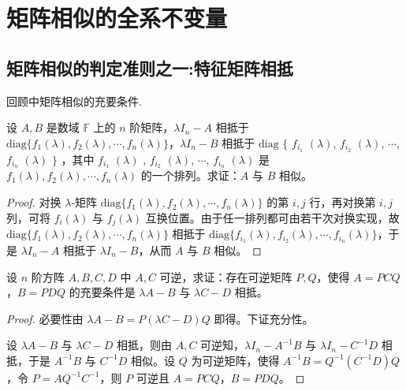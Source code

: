 \documentclass[../../main.tex]{subfiles}%
\begin{document}
\section{矩阵相似的全系不变量}

\subsection{矩阵相似的判定准则之一:特征矩阵相抵}

回顾中矩阵相似的充要条件.

\begin{proposition}\label{proposition:对角元素任意排列仍相似}
设 $A,B$ 是数域 $\mathbb{F}$ 上的 $n$ 阶矩阵，$\lambda I_n - A$ 相抵于 $\mathrm{diag}\{f_1(\lambda), f_2(\lambda), \cdots, f_n(\lambda)\}$，$\lambda I_n - B$ 相抵于 $\mathrm{diag}$ $\{ $ $f_{i_1}$ $(\lambda)$, $f_{i_2}$ $(\lambda)$, $\cdots$, $f_{i_n}$ $(\lambda)$ $\}$ ，其中 $f_{i_1}$ $(\lambda)$ , $f_{i_2}$ $(\lambda)$, $\cdots$, $f_{i_n}$ $(\lambda)$ 是 $f_1(\lambda), f_2(\lambda), \cdots, f_n(\lambda)$ 的一个排列。求证：$A$ 与 $B$ 相似。
\end{proposition}
\begin{proof}

对换 $\lambda$-矩阵 $\mathrm{diag}\{f_1(\lambda), f_2(\lambda), \cdots, f_n(\lambda)\}$ 的第 $i,j$ 行，再对换第 $i,j$ 列，可将 $f_i(\lambda)$ 与 $f_j(\lambda)$ 互换位置。由于任一排列都可由若干次对换实现，故 $\mathrm{diag}\{f_1(\lambda), f_2(\lambda), \cdots, f_n(\lambda)\}$ 相抵于 $\mathrm{diag}\{f_{i_1}(\lambda), f_{i_2}(\lambda), \cdots, f_{i_n}(\lambda)\}$，于是 $\lambda I_n - A$ 相抵于 $\lambda I_n - B$，从而 $A$ 与 $B$ 相似。

\end{proof}

\begin{example}
设 $n$ 阶方阵 $A,B,C,D$ 中 $A,C$ 可逆，求证：存在可逆矩阵 $P,Q$，使得 $A = PCQ$，$B = PDQ$ 的充要条件是 $\lambda A - B$ 与 $\lambda C - D$ 相抵。
\end{example}
\begin{proof}

必要性由 $\lambda A - B = P(\lambda C - D)Q$ 即得。下证充分性。

设 $\lambda A - B$ 与 $\lambda C - D$ 相抵，则由 $A,C$ 可逆知，$\lambda I_n - A^{-1}B$ 与 $\lambda I_n - C^{-1}D$ 相抵，于是 $A^{-1}B$ 与 $C^{-1}D$ 相似。设 $Q$ 为可逆矩阵，使得 $A^{-1}B = Q^{-1}(C^{-1}D)Q$，令 $P = AQ^{-1}C^{-1}$，则 $P$ 可逆且 $A = PCQ$，$B = PDQ$。

\end{proof}
\end{document}
